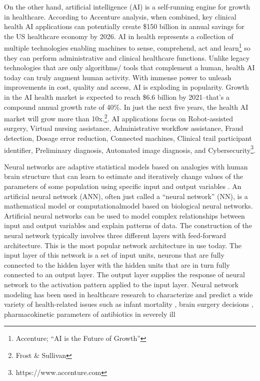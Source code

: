 \documentclass[letterpaper%
, twoside%
, 12pt%
,these%
, english%
,creativecommons,hyperref%
]{thETS}
\begin{document}
\begin{introduction}
\par On the other hand,  artificial intelligence (AI) is a self-running engine for growth in healthcare. According to Accenture analysis, when combined, key clinical health AI applications can potentially create \$150 billion in annual savings for the US healthcare economy by 2026. AI in health represents a collection of multiple technologies enabling machines to sense, comprehend, act and learn\footnote{ Accenture; “AI is the Future of Growth”} so they can perform administrative and clinical healthcare functions. Unlike legacy technologies that are only algorithms/ tools that complement a human, health AI today can truly augment human activity. With immense power to unleash improvements in cost, quality and access, AI is exploding in popularity. Growth in the AI health market is expected to reach \$6.6 billion by 2021--that’s a compound annual growth rate of 40\%. In just the next five years, the health AI market will grow more than 10x.\footnote{Frost \& Sullivan}. AI applications focus on Robot-assisted surgery, Virtual nursing assistance,  Administrative workflow assistance,  Fraud detection, Dosage error reduction, Connected machines, Clinical trail participant identifier, Preliminary diagnosis, Automated image diagnosis, and Cybersecurity\footnote{https://www.accenture.com}. 
\par Neural networks are adaptive statistical models based
on analogies with human brain structure that can learn to
estimate and iteratively change values of the parameters of
some population using specific input and output variables
\cite{Abdi}. An artificial neural network (ANN), often just called a
“neural network” (NN), is a mathematical model or computationalmodel
based on biological neural networks. Artificial
neural networks can be used to model complex relationships
between input and output variables and explain patterns
of data. The construction of the neural network typically
involves three different layers with feed-forward architecture.
This is the most popular network architecture in use today.
The input layer of this network is a set of input units, neurons
that are fully connected to the hidden layer with the hidden
units that are in turn fully connected to an output layer.
The output layer supplies the response of neural network
to the activation pattern applied to the input layer. Neural
network modeling has been used in healthcare research to
characterize and predict a wide variety of health-related
issues such as infant mortality \cite{Gismondi}, brain surgery decisions
\cite{Li}, pharmacokinetic parameters of antibiotics in severely ill

\end{introduction}
\end{document}
